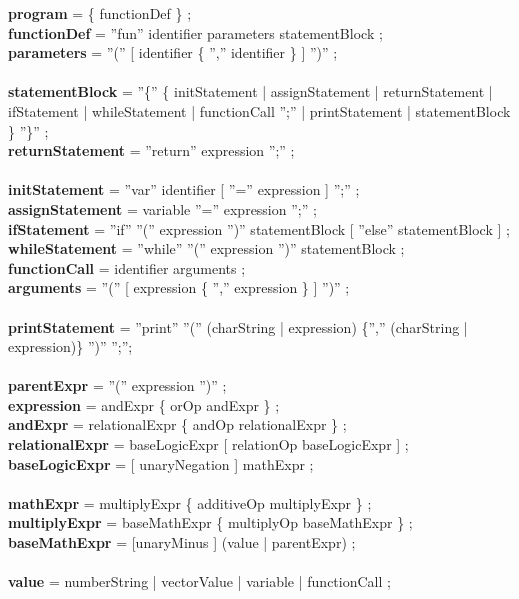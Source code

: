 \documentclass[11pt]{article} %
\begin{document}
\textbf{program} = \{ functionDef \} ;\\
\textbf{functionDef} = ''fun'' identifier parameters statementBlock ;\\
\textbf{parameters} = ''('' [ identifier \{ '','' identifier \} ] '')'' ;\\
\\
\textbf{statementBlock} = ''\{'' \{ initStatement | assignStatement | returnStatement |
ifStatement | whileStatement | functionCall '';'' |  printStatement | statementBlock \} ''\}'' ;\\
\textbf{returnStatement} = ''return'' expression '';'' ;\\
\\
\textbf{initStatement} = ''var'' identifier [ ''='' expression ] '';'' ;\\
\textbf{assignStatement} = variable ''='' expression '';'' ;\\
\textbf{ifStatement} = ''if'' ''('' expression '')'' statementBlock [ ''else'' statementBlock ] ;\\
\textbf{whileStatement} = ''while'' ''('' expression '')'' statementBlock ;\\
\textbf{functionCall} = identifier arguments ;\\
\textbf{arguments} = ''('' [ expression \{ '','' expression \} ] '')'' ;\\
\\
\textbf{printStatement} = ''print'' ''('' (charString | expression) \{'','' (charString | expression)\} '')'' '';'';\\
\\
\textbf{parentExpr} = ''('' expression '')'' ;\\
\textbf{expression} = andExpr \{ orOp andExpr \} ;\\
\textbf{andExpr} = relationalExpr \{ andOp relationalExpr \} ;\\
\textbf{relationalExpr} = baseLogicExpr [ relationOp baseLogicExpr ] ;\\
\textbf{baseLogicExpr} = [ unaryNegation ] mathExpr ;\\
\\
\textbf{mathExpr} = multiplyExpr \{ additiveOp multiplyExpr \} ;\\
\textbf{multiplyExpr} = baseMathExpr \{ multiplyOp baseMathExpr \} ;\\
\textbf{baseMathExpr} = [unaryMinus ] (value | parentExpr) ;\\
\\
\textbf{value} = numberString | vectorValue | variable | functionCall ;\\
\end{document}
